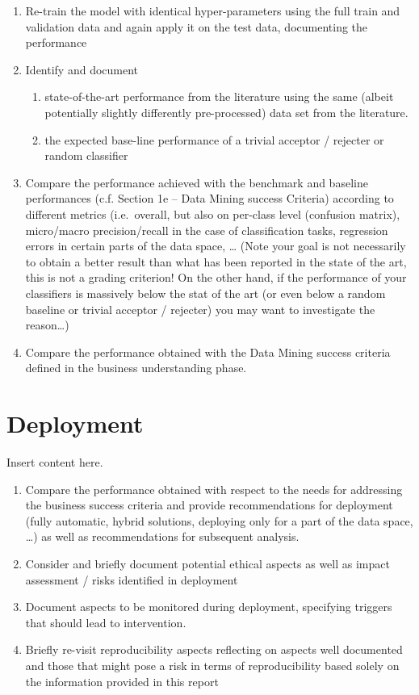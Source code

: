 \documentclass[sigchi]{acmart}
\def\tightlist{}
\begin{document}
\begin{enumerate}
\def\labelenumi{\alph{enumi}.}
\setcounter{enumi}{1}
\tightlist
\item
  Re-train the model with identical hyper-parameters using the full train and validation data and again apply it on the test data, documenting the performance
\item
  Identify and document

  \begin{enumerate}
  \def\labelenumii{\roman{enumii}.}
  \tightlist
  \item
    state-of-the-art performance from the literature using the same (albeit potentially slightly differently pre-processed) data set from the literature.
  \item
    the expected base-line performance of a trivial acceptor / rejecter or random classifier
  \end{enumerate}
\item
  Compare the performance achieved with the benchmark and baseline performances (c.f. Section 1e -- Data Mining success Criteria) according to different metrics (i.e.~overall, but also on per-class level (confusion matrix), micro/macro precision/recall in the case of classification tasks, regression errors in certain parts of the data space, \ldots{} (Note your goal is not necessarily to obtain a better result than what has been reported in the state of the art, this is not a grading criterion! On the other hand, if the performance of your classifiers is massively below the stat of the art (or even below a random baseline or trivial acceptor / rejecter) you may want to investigate the reason\ldots{})
\item
  Compare the performance obtained with the Data Mining success criteria defined in the business understanding phase.
\end{enumerate}

\hypertarget{deployment}{%
\section{Deployment}\label{deployment}}

Insert content here.

\begin{enumerate}
\def\labelenumi{\alph{enumi}.}
\tightlist
\item
  Compare the performance obtained with respect to the needs for addressing the business success criteria and provide recommendations for deployment (fully automatic, hybrid solutions, deploying only for a part of the data space, \ldots{}) as well as recommendations for subsequent analysis.
\item
  Consider and briefly document potential ethical aspects as well as impact assessment / risks identified in deployment
\item
  Document aspects to be monitored during deployment, specifying triggers that should lead to intervention.
\item
  Briefly re-visit reproducibility aspects reflecting on aspects well documented and those that might pose a risk in terms of reproducibility based solely on the information provided in this report
\end{enumerate}
\end{document}
